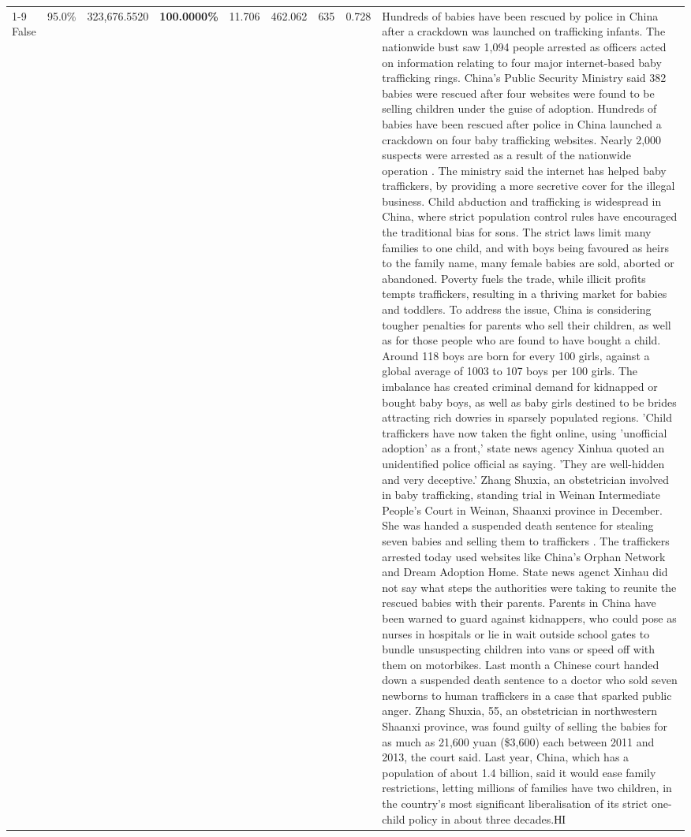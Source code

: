 \begin{table}[H]
\begin{tabular}{lllrlllll}
\cline{1-9}
False & 95.0\% & 323,676.5520 & \bfseries \color{red} 100.0000\% & 11.706 & 462.062 & 635 & 0.728 & Hundreds of babies have been rescued by police in China after a crackdown was launched on trafficking infants. The nationwide bust saw 1,094 people arrested as officers acted on information relating to four major internet-based baby trafficking rings. China's Public Security Ministry said 382 babies were rescued after four websites were found to be selling children under the guise of adoption. Hundreds of babies have been rescued after police in China launched a crackdown on four baby trafficking websites. Nearly 2,000 suspects were arrested as a result of the nationwide operation . The ministry said the internet has helped baby traffickers, by providing a more secretive cover for the illegal business. Child abduction and trafficking is widespread in China, where strict population control rules have encouraged the traditional bias for sons. The strict laws limit many families to one child, and with boys being favoured as heirs to the family name, many female babies are sold, aborted or abandoned. Poverty fuels the trade, while illicit profits tempts traffickers, resulting in a thriving market for babies and toddlers. To address the issue, China is considering tougher penalties for parents who sell their children, as well as for those people who are found to have bought a child. Around 118 boys are born for every 100 girls, against a global average of 1003 to 107 boys per 100 girls. The imbalance has created criminal demand for kidnapped or bought baby boys, as well as baby girls destined to be brides attracting rich dowries in sparsely populated regions. 'Child traffickers have now taken the fight online, using 'unofficial adoption' as a front,' state news agency Xinhua quoted an unidentified police official as saying. 'They are well-hidden and very deceptive.' Zhang Shuxia, an obstetrician involved in baby trafficking, standing trial in Weinan Intermediate People's Court in Weinan, Shaanxi province in December. She was handed a suspended death sentence for stealing seven babies and selling them to traffickers . The traffickers arrested today used websites like China's Orphan Network and Dream Adoption Home. State news agenct Xinhau did not say what steps the authorities were taking to reunite the rescued babies with their parents. Parents in China have been warned to guard against kidnappers, who could pose as nurses in hospitals or lie in wait outside school gates to bundle unsuspecting children into vans or speed off with them on motorbikes. Last month a Chinese court handed down a suspended death sentence to a doctor who sold seven newborns to human traffickers in a case that sparked public anger. Zhang Shuxia, 55, an obstetrician in northwestern Shaanxi province, was found guilty of selling the babies for as much as 21,600 yuan (\$3,600) each between 2011 and 2013, the court said. Last year, China, which has a population of about 1.4 billion, said it would ease family restrictions, letting millions of families have two children, in the country's most significant liberalisation of its strict one-child policy in about three decades.НІ \\

\end{tabular}
\end{table}
